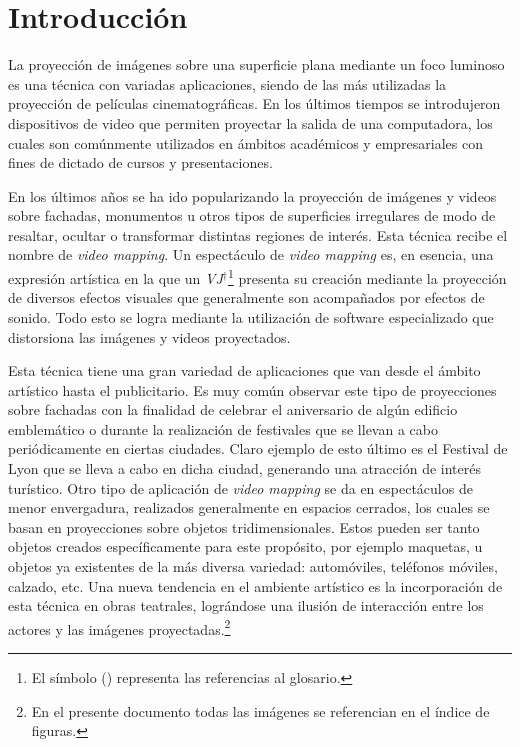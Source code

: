 ﻿\chapter{Introducción}

La proyección de imágenes sobre una superficie plana mediante un foco luminoso es una técnica con variadas aplicaciones, siendo de las más utilizadas la proyección de películas cinematográficas. En los últimos tiempos se introdujeron dispositivos de video que permiten proyectar la salida de una computadora, los cuales son comúnmente utilizados en ámbitos académicos y empresariales con fines de dictado de cursos y presentaciones.

En los últimos años se ha ido popularizando la proyección de imágenes y videos sobre fachadas, monumentos u otros tipos de superficies irregulares de modo de resaltar, ocultar o transformar distintas regiones de interés. Esta técnica recibe el nombre de \emph{video mapping}. Un espectáculo de \emph{video mapping} es, en esencia, una expresión artística en la que un \emph{VJ}$^\dagger$\footnote{El símbolo (\dag) representa las referencias al glosario.} presenta su creación mediante la proyección de diversos efectos visuales que generalmente son acompañados por efectos de sonido. Todo esto se logra mediante la utilización de software especializado que distorsiona las imágenes y videos proyectados.

Esta técnica tiene una gran variedad de aplicaciones que van desde el ámbito artístico hasta el publicitario. 
Es muy común observar este tipo de proyecciones sobre fachadas con la finalidad de celebrar el aniversario de algún edificio emblemático o durante la realización de festivales que se llevan a cabo periódicamente en ciertas ciudades. Claro ejemplo de esto último es el Festival de Lyon \cite{FestivalLyon} que se lleva a cabo en dicha ciudad, generando una atracción de interés turístico.
Otro tipo de aplicación de \emph{video mapping} se da en espectáculos de menor envergadura, realizados generalmente en espacios cerrados, los cuales se basan en proyecciones sobre objetos tridimensionales. Estos pueden ser tanto objetos creados específicamente para este propósito, por ejemplo maquetas, u objetos ya existentes de la más diversa variedad: automóviles, teléfonos móviles, calzado, etc. Una nueva tendencia en el ambiente artístico es la incorporación de esta técnica en obras teatrales, lográndose una ilusión de interacción entre los actores y las imágenes proyectadas.\footnote{En el presente documento todas las imágenes se referencian en el índice de figuras.}

